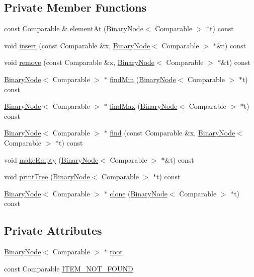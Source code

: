 \subsection*{Private Member Functions}
\begin{DoxyCompactItemize}
\item 
const Comparable \& \hyperlink{classBST_adb7d0e1197c30ff79cb0fb05fcd67249}{element\+At} (\hyperlink{classBinaryNode}{Binary\+Node}$<$ Comparable $>$ $\ast$t) const
\item 
void \hyperlink{classBST_a4d885d655c4a4e29c2d40f2b48baf7d3}{insert} (const Comparable \&x, \hyperlink{classBinaryNode}{Binary\+Node}$<$ Comparable $>$ $\ast$\&t) const
\item 
void \hyperlink{classBST_afe360f55921ac51ac78ddde6556fe946}{remove} (const Comparable \&x, \hyperlink{classBinaryNode}{Binary\+Node}$<$ Comparable $>$ $\ast$\&t) const
\item 
\hyperlink{classBinaryNode}{Binary\+Node}$<$ Comparable $>$ $\ast$ \hyperlink{classBST_a1b79bb91ccef69398a80bf508a2a6097}{find\+Min} (\hyperlink{classBinaryNode}{Binary\+Node}$<$ Comparable $>$ $\ast$t) const
\item 
\hyperlink{classBinaryNode}{Binary\+Node}$<$ Comparable $>$ $\ast$ \hyperlink{classBST_a922e4c2dfbd460db9e31531d8d20282b}{find\+Max} (\hyperlink{classBinaryNode}{Binary\+Node}$<$ Comparable $>$ $\ast$t) const
\item 
\hyperlink{classBinaryNode}{Binary\+Node}$<$ Comparable $>$ $\ast$ \hyperlink{classBST_a858dd15e9d15affeb88785d0c5a65ae3}{find} (const Comparable \&x, \hyperlink{classBinaryNode}{Binary\+Node}$<$ Comparable $>$ $\ast$t) const
\item 
void \hyperlink{classBST_a5582f1066a084181d6a79ec0a6e9f9f2}{make\+Empty} (\hyperlink{classBinaryNode}{Binary\+Node}$<$ Comparable $>$ $\ast$\&t) const
\item 
void \hyperlink{classBST_a76247d69325065d2485349148d7940e7}{print\+Tree} (\hyperlink{classBinaryNode}{Binary\+Node}$<$ Comparable $>$ $\ast$t) const
\item 
\hyperlink{classBinaryNode}{Binary\+Node}$<$ Comparable $>$ $\ast$ \hyperlink{classBST_acefda5ede0b55cbb1f7deab580bd8fd9}{clone} (\hyperlink{classBinaryNode}{Binary\+Node}$<$ Comparable $>$ $\ast$t) const
\end{DoxyCompactItemize}
\subsection*{Private Attributes}
\begin{DoxyCompactItemize}
\item 
\hyperlink{classBinaryNode}{Binary\+Node}$<$ Comparable $>$ $\ast$ \hyperlink{classBST_a48d08a19c48c0c260a7d5db37149ad0f}{root}
\item 
const Comparable \hyperlink{classBST_a93811f042c4201e993fe39638c15f251}{I\+T\+E\+M\+\_\+\+N\+O\+T\+\_\+\+F\+O\+U\+ND}
\end{DoxyCompactItemize}
